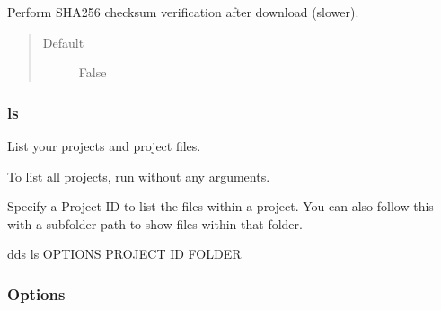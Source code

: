 \documentclass[letterpaper,10pt,english]{sphinxmanual}
\begin{document}
\begin{fulllineitems}
\label{\detokenize{usage:cmdoption-dds-get-verify-checksum}}
\sphinxAtStartPar
Perform SHA\sphinxhyphen{}256 checksum verification after download (slower).
\begin{quote}\begin{description}
\item[{Default}] \leavevmode
\sphinxAtStartPar
False

\end{description}\end{quote}

\end{fulllineitems}



\subsubsection{ls}
\label{\detokenize{usage:dds-ls}}
\sphinxAtStartPar
List your projects and project files.

\sphinxAtStartPar
To list all projects, run  without any arguments.

\sphinxAtStartPar
Specify a Project ID to list the files within a project.
You can also follow this with a subfolder path to show files within that folder.

\begin{sphinxVerbatim}[commandchars=\\\{\}]
dds ls \PYG{o}{[}OPTIONS\PYG{o}{]} \PYG{o}{[}PROJECT ID\PYG{o}{]} \PYG{o}{[}FOLDER\PYG{o}{]}
\end{sphinxVerbatim}
\subsubsection*{Options}
\end{document}
